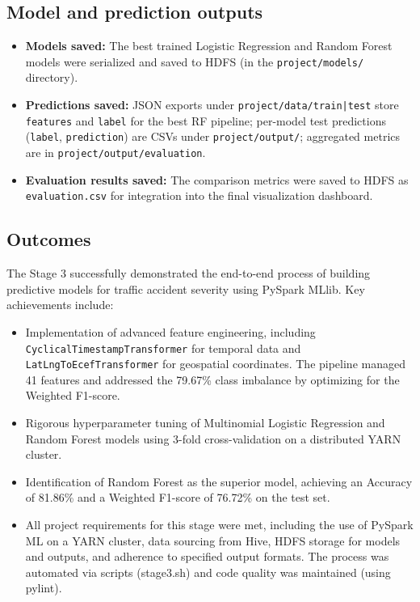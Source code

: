 \documentclass[11pt,a4paper]{article}
\begin{document}
\subsection*{Model and prediction outputs}
\begin{itemize}
    \item \textbf{Models saved:} The best trained Logistic Regression and Random Forest models were serialized and saved to HDFS (in the \texttt{project/models/} directory).
    \item \textbf{Predictions saved:} JSON exports under \texttt{project/data/train|test} store \texttt{features} and \texttt{label} for the best RF pipeline; per-model test predictions (\texttt{label}, \texttt{prediction}) are CSVs under \texttt{project/output/}; aggregated metrics are in \texttt{project/output/evaluation}.
    \item \textbf{Evaluation results saved:} The comparison metrics were saved to HDFS as \texttt{evaluation.csv} for integration into the final visualization dashboard.
\end{itemize}

\subsection*{Outcomes}
The Stage 3 successfully demonstrated the end-to-end process of building predictive models for traffic accident severity using PySpark MLlib. Key achievements include:

\begin{itemize}
    \item Implementation of advanced feature engineering, including \texttt{CyclicalTimestampTransformer} for temporal data and \texttt{LatLngToEcefTransformer} for geospatial coordinates. The pipeline managed 41 features and addressed the 79.67\% class imbalance by optimizing for the Weighted F1-score.
    
    \item  Rigorous hyperparameter tuning of Multinomial Logistic Regression and Random Forest models using 3-fold cross-validation on a distributed YARN cluster.
    
    \item Identification of Random Forest as the superior model, achieving an Accuracy of 81.86\% and a Weighted F1-score of 76.72\% on the test set.
    
    \item All project requirements for this stage were met, including the use of PySpark ML on a YARN cluster, data sourcing from Hive, HDFS storage for models and outputs, and adherence to specified output formats. The process was automated via scripts (stage3.sh) and code quality was maintained (using pylint).
\end{itemize}
\end{document}
